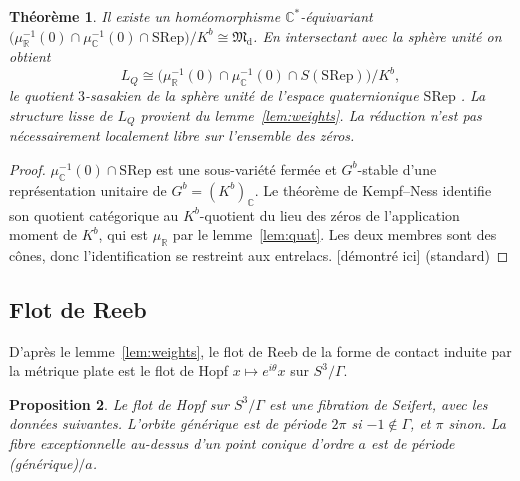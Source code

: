 \documentclass[11pt]{article}
\newtheorem{theorem}{Théorème}[section]
\newtheorem{proposition}[theorem]{Proposition}
\theoremstyle{definition}
\theoremstyle{remark}
\newcommand{\tagP}{\textsf{\small[démontré ici]}}
\newcommand{\C}{\mathbb{C}}\newcommand{\R}{\mathbb{R}}\newcommand{\Z}{\mathbb{Z}}
\newcommand{\M}{\mathfrak{M}}\newcommand{\Rep}{\mathrm{Rep}}\newcommand{\SRep}{\mathrm{SRep}}
\begin{document}
\begin{theorem}\label{thm:D}
Il existe un homéomorphisme $\C^*$-équivariant $\bigl(\mu_\R^{-1}(0)\cap\mu_\C^{-1}(0)\cap\SRep\bigr)/K^b\cong\M_{\mathrm d}$. En intersectant avec la sphère unité on obtient
\[L_Q\cong\bigl(\mu_\R^{-1}(0)\cap\mu_\C^{-1}(0)\cap S(\SRep)\bigr)/K^b,\]
le quotient $3$-sasakien de la sphère unité de l'espace quaternionique $\SRep$ \cite{BGM94,BG99}. La structure lisse de $L_Q$ provient du lemme~\ref{lem:weights}. La réduction n'est pas nécessairement localement libre sur l'ensemble des zéros.
\end{theorem}
\begin{proof}
$\mu_\C^{-1}(0)\cap\SRep$ est une sous-variété fermée et $G^b$-stable d'une représentation unitaire de $G^b=(K^b)_\C$. Le théorème de Kempf--Ness \cite{KN79} identifie son quotient catégorique au $K^b$-quotient du lieu des zéros de l'application moment de $K^b$, qui est $\mu_\R$ par le lemme~\ref{lem:quat}. Les deux membres sont des cônes, donc l'identification se restreint aux entrelacs. \tagP{} (standard)
\end{proof}

\subsection{Flot de Reeb}
D'après le lemme~\ref{lem:weights}, le flot de Reeb de la forme de contact induite par la métrique plate est le flot de Hopf $x\mapsto e^{i\theta}x$ sur $S^3/\Gamma$.

\begin{proposition}\label{prop:seifert}
Le flot de Hopf sur $S^3/\Gamma$ est une fibration de Seifert, avec les données suivantes. L'orbite générique est de période $2\pi$ si $-1\notin\Gamma$, et $\pi$ sinon. La fibre exceptionnelle au-dessus d'un point conique d'ordre $a$ est de période (générique)$/a$.
\end{proposition}
\end{document}
